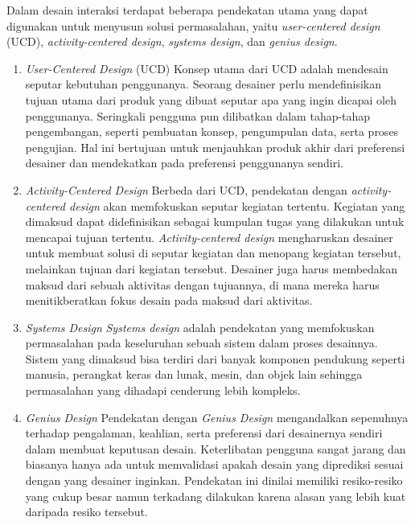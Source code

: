 Dalam desain interaksi terdapat beberapa pendekatan utama yang dapat digunakan untuk menyusun solusi permasalahan, yaitu \textit{user-centered design} (UCD), \textit{activity-centered design}, \textit{systems design}, dan \textit{genius design}. \parencite{saffer2010designing}

\begin{enumerate}
  \item \textit{User-Centered Design} (UCD)
  \subitem Konsep utama dari UCD adalah mendesain seputar kebutuhan penggunanya. Seorang desainer perlu mendefinisikan tujuan utama dari produk yang dibuat seputar apa yang ingin dicapai oleh penggunanya. Seringkali pengguna pun dilibatkan dalam tahap-tahap pengembangan, seperti pembuatan konsep, pengumpulan data, serta proses pengujian. Hal ini bertujuan untuk menjauhkan produk akhir dari preferensi desainer dan mendekatkan pada preferensi penggunanya sendiri.
   
  \item \textit{Activity-Centered Design}
  \subitem Berbeda dari UCD, pendekatan dengan \textit{activity-centered design} akan memfokuskan seputar kegiatan tertentu. Kegiatan yang dimaksud dapat didefinisikan sebagai kumpulan tugas yang dilakukan untuk mencapai tujuan tertentu. \textit{Activity-centered design} mengharuskan desainer untuk membuat solusi di seputar kegiatan dan menopang kegiatan tersebut, melainkan tujuan dari kegiatan tersebut. Desainer juga harus membedakan maksud dari sebuah aktivitas dengan tujuannya, di mana mereka harus menitikberatkan fokus desain pada maksud dari aktivitas.
 
  \item \textit{Systems Design}
  \subitem \textit{Systems design} adalah pendekatan yang memfokuskan permasalahan pada keseluruhan sebuah sistem dalam proses desainnya. Sistem yang dimaksud bisa terdiri dari banyak komponen pendukung seperti manusia, perangkat keras dan lunak, mesin, dan objek lain sehingga permasalahan yang dihadapi cenderung lebih kompleks.
 
  \item \textit{Genius Design}
  \subitem Pendekatan dengan \textit{Genius Design} mengandalkan sepenuhnya terhadap pengalaman, keahlian, serta preferensi dari desainernya sendiri dalam membuat keputusan desain. Keterlibatan pengguna sangat jarang dan biasanya hanya ada untuk memvalidasi apakah desain yang diprediksi sesuai dengan yang desainer inginkan. Pendekatan ini dinilai memiliki resiko-resiko yang cukup besar namun terkadang dilakukan karena alasan yang lebih kuat daripada resiko tersebut.
 
\end{enumerate}

